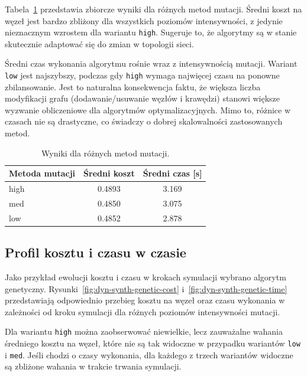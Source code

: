Tabela~\ref{tab:dyn-synth-warm} przedstawia zbiorcze wyniki dla różnych metod mutacji. Średni koszt na węzeł jest bardzo zbliżony dla wszystkich poziomów intensywności, z jedynie nieznacznym wzrostem dla wariantu \texttt{high}. Sugeruje to, że algorytmy są w stanie skutecznie adaptować się do zmian w topologii sieci.

Średni czas wykonania algorytmu rośnie wraz z intensywnością mutacji. Wariant \texttt{low} jest najszybszy, podczas gdy \texttt{high} wymaga najwięcej czasu na ponowne zbilansowanie. Jest to naturalna konsekwencja faktu, że większa liczba modyfikacji grafu (dodawanie/usuwanie węzłów i krawędzi) stanowi większe wyzwanie obliczeniowe dla algorytmów optymalizacyjnych. Mimo to, różnice w czasach nie są drastyczne, co świadczy o dobrej skalowalności zastosowanych metod.

\begin{table}[H]
  \centering
  \caption{Wyniki dla różnych metod mutacji.}
  \label{tab:dyn-synth-warm}
  \begin{tabular}{lcc}
    \toprule
    \textbf{Metoda mutacji} & \textbf{Średni koszt} & \textbf{Średni czas [s]} \\
    \midrule
    high                    & 0.4893                & 3.169                    \\
    med                     & 0.4850                & 3.075                    \\
    low                     & 0.4852                & 2.878                    \\
    \bottomrule
  \end{tabular}
\end{table}

\subsection{Profil kosztu i czasu w czasie}
Jako przykład ewolucji kosztu i czasu w krokach symulacji wybrano algorytm genetyczny. Rysunki~\ref{fig:dyn-synth-genetic-cost} i~\ref{fig:dyn-synth-genetic-time} przedstawiają odpowiednio przebieg kosztu na węzeł oraz czasu wykonania w zależności od kroku symulacji dla różnych poziomów intensywności mutacji.

Dla wariantu \texttt{high} można zaobserwować niewielkie, lecz zauważalne wahania średniego kosztu na węzeł, które nie są tak widoczne w przypadku wariantów \texttt{low} i \texttt{med}. Jeśli chodzi o czasy wykonania, dla każdego z trzech wariantów widoczne są zbliżone wahania w trakcie trwania symulacji.

